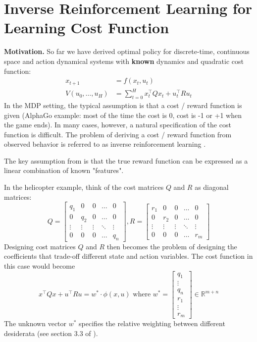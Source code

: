 \documentclass[a4paper]{article}
\begin{document}
\section{Inverse Reinforcement Learning for Learning Cost Function}
\label{inverse_rl}
\textbf{Motivation.} So far we have derived optimal policy for discrete-time, continuous space and action dynamical systems with \textbf{known} dynamics and quadratic cost function:
\begin{align}
x_{t+1} &= f(x_t,u_t) \\
V(u_0,\ldots,u_H) &= \sum_{t=0}^H x_t^\intercal Qx_t + u_t^\intercal Ru_t
\end{align}
In the MDP setting, the typical assumption is that a cost / reward function is given (AlphaGo example: most of the time the cost is 0, cost is -1 or +1 when the game ends). In many cases, however, a natural specification of the cost function is difficult. The problem of deriving a cost / reward function from observed behavior is referred to as inverse reinforcement learning \cite{abbeel2004apprenticeship}. 


The key assumption from \cite{abbeel2004apprenticeship} is that the true reward function can be expressed as a linear combination of known "features". 

In the helicopter example, think of the cost matrices $Q$ and $R$ as diagonal matrices:
\begin{equation}
Q = \begin{bmatrix}
  q_1 & 0 & 0 & \dots  & 0 \\
  0 & q_{2} & 0 & \dots  & 0 \\
  \vdots & \vdots & \vdots & \ddots & \vdots \\
  0 & 0 & 0 & \dots  & q_{n}
\end{bmatrix}, 
R = \begin{bmatrix}
r_{1} & 0 & 0 & \dots  & 0 \\
0 & r_{2} & 0 & \dots  & 0 \\
\vdots & \vdots & \vdots & \ddots & \vdots \\
0 & 0 & 0 & \dots  & r_{m}
\end{bmatrix}
\end{equation}
Designing cost matrices $Q$ and $R$ then becomes the problem of designing the coefficients that trade-off different state and action variables. The cost function in this case would become
\begin{equation}
x^\intercal Qx + u^\intercal Ru = w^*\cdot\phi(x,u) \text{ where } w^* = \begin{bmatrix}
q_1 \\ \vdots \\ q_n\\r_1\\ \vdots\\r_m
\end{bmatrix} \in \mathbb{R}^{m+n}
\end{equation}
The unknown vector $w^*$ specifies the relative weighting between different desiderata (see section 3.3 of \cite{abbeel2007application}). 
\end{document}

